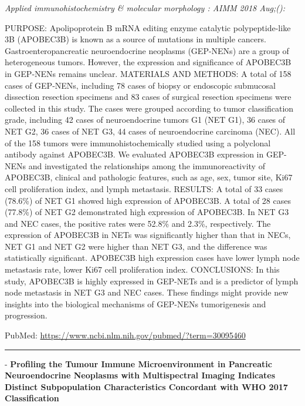 \documentclass[]{article}
\begin{document}
\emph{Applied immunohistochemistry \& molecular morphology : AIMM 2018
Aug;():}

PURPOSE: Apolipoprotein B mRNA editing enzyme catalytic polypeptide-like
3B (APOBEC3B) is known as a source of mutations in multiple cancers.
Gastroenteropancreatic neuroendocrine neoplasms (GEP-NENs) are a group
of heterogeneous tumors. However, the expression and significance of
APOBEC3B in GEP-NENs remains unclear. MATERIALS AND METHODS: A total of
158 cases of GEP-NENs, including 78 cases of biopsy or endoscopic
submucosal dissection resection specimens and 83 cases of surgical
resection specimens were collected in this study. The cases were grouped
according to tumor classification grade, including 42 cases of
neuroendocrine tumors G1 (NET G1), 36 cases of NET G2, 36 cases of NET
G3, 44 cases of neuroendocrine carcinoma (NEC). All of the 158 tumors
were immunohistochemically studied using a polyclonal antibody against
APOBEC3B. We evaluated APOBEC3B expression in GEP-NENs and investigated
the relationships among the immunoreactivity of APOBEC3B, clinical and
pathologic features, such as age, sex, tumor site, Ki67 cell
proliferation index, and lymph metastasis. RESULTS: A total of 33 cases
(78.6\%) of NET G1 showed high expression of APOBEC3B. A total of 28
cases (77.8\%) of NET G2 demonstrated high expression of APOBEC3B. In
NET G3 and NEC cases, the positive rates were 52.8\% and 2.3\%,
respectively. The expression of APOBEC3B in NETs was significantly
higher than that in NECs, NET G1 and NET G2 were higher than NET G3, and
the difference was statistically significant. APOBEC3B high expression
cases have lower lymph node metastasis rate, lower Ki67 cell
proliferation index. CONCLUSIONS: In this study, APOBEC3B is highly
expressed in GEP-NETs and is a predictor of lymph node metastasis in NET
G3 and NEC cases. These findings might provide new insights into the
biological mechanisms of GEP-NENs tumorigenesis and progression.

PubMed: \url{https://www.ncbi.nlm.nih.gov/pubmed/?term=30095460}

{}

{}

\begin{center}\rule{0.5\linewidth}{\linethickness}\end{center}

 - \textbf{Profiling the Tumour Immune Microenvironment in Pancreatic
Neuroendocrine Neoplasms with Multispectral Imaging Indicates Distinct
Subpopulation Characteristics Concordant with WHO 2017 Classification}
\end{document}
